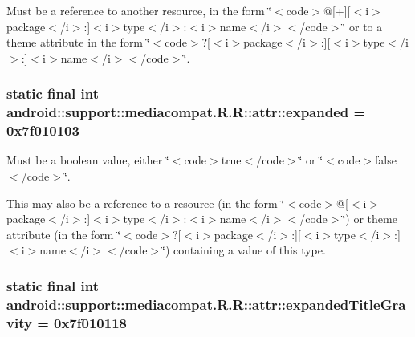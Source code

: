 Must be a reference to another resource, in the form \char`\"{}$<$code$>$@\mbox{[}+\mbox{]}\mbox{[}$<$i$>$package$<$/i$>$:\mbox{]}$<$i$>$type$<$/i$>$:$<$i$>$name$<$/i$>$$<$/code$>$\char`\"{} or to a theme attribute in the form \char`\"{}$<$code$>$?\mbox{[}$<$i$>$package$<$/i$>$:\mbox{]}\mbox{[}$<$i$>$type$<$/i$>$:\mbox{]}$<$i$>$name$<$/i$>$$<$/code$>$\char`\"{}. \hypertarget{classandroid_1_1support_1_1mediacompat_1_1_r_1_1attr_9a456e1910b1d606220d08f336675480}{
\subsubsection[{expanded}]{\setlength{\rightskip}{0pt plus 5cm}static final int android::support::mediacompat.R.R::attr::expanded = 0x7f010103}}
\label{classandroid_1_1support_1_1mediacompat_1_1_r_1_1attr_9a456e1910b1d606220d08f336675480}


Must be a boolean value, either \char`\"{}$<$code$>$true$<$/code$>$\char`\"{} or \char`\"{}$<$code$>$false$<$/code$>$\char`\"{}. 

This may also be a reference to a resource (in the form \char`\"{}$<$code$>$@\mbox{[}$<$i$>$package$<$/i$>$:\mbox{]}$<$i$>$type$<$/i$>$:$<$i$>$name$<$/i$>$$<$/code$>$\char`\"{}) or theme attribute (in the form \char`\"{}$<$code$>$?\mbox{[}$<$i$>$package$<$/i$>$:\mbox{]}\mbox{[}$<$i$>$type$<$/i$>$:\mbox{]}$<$i$>$name$<$/i$>$$<$/code$>$\char`\"{}) containing a value of this type. \hypertarget{classandroid_1_1support_1_1mediacompat_1_1_r_1_1attr_43c1912cf066247718c446afb25c6f6b}{
\subsubsection[{expandedTitleGravity}]{\setlength{\rightskip}{0pt plus 5cm}static final int android::support::mediacompat.R.R::attr::expandedTitleGravity = 0x7f010118}}
\label{classandroid_1_1support_1_1mediacompat_1_1_r_1_1attr_43c1912cf066247718c446afb25c6f6b}


